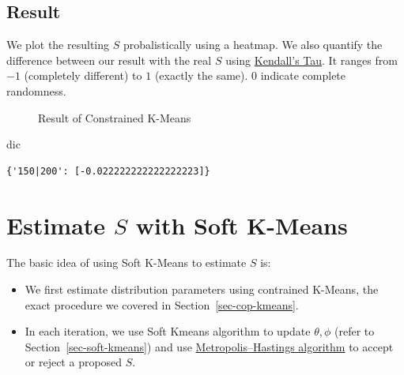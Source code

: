 \documentclass[
  letterpaper,
  DIV=11,
  numbers=noendperiod]{scrreprt}
\newenvironment{Shaded}{\begin{snugshade}}{\end{snugshade}}
\newcommand{\NormalTok}[1]{\textcolor[rgb]{0.00,0.23,0.31}{#1}}
\providecommand{\tightlist}{%
  \setlength{\itemsep}{0pt}\setlength{\parskip}{0pt}}\usepackage{longtable,booktabs,array}
\begin{document}
\section{Result}\label{result-1}

We plot the resulting \(S\) probalistically using a heatmap. We also
quantify the difference between our result with the real \(S\) using
\href{https://en.wikipedia.org/wiki/Kendall_rank_correlation_coefficient}{Kendall's
Tau}. It ranges from \(-1\) (completely different) to \(1\) (exactly the
same). \(0\) indicate complete randomness.

\begin{figure}


\caption{\label{fig-cop-kmeans-result}Result of Constrained K-Means}

\end{figure}%

\begin{Shaded}
\begin{Highlighting}[]
\NormalTok{dic}
\end{Highlighting}
\end{Shaded}

\begin{verbatim}
{'150|200': [-0.022222222222222223]}
\end{verbatim}


\chapter{\texorpdfstring{Estimate \(S\) with Soft
K-Means}{Estimate S with Soft K-Means}}\label{sec-estS-soft-kmeans}

The basic idea of using Soft K-Means to estimate \(S\) is:

\begin{itemize}
\tightlist
\item
  We first estimate distribution parameters using contrained K-Means,
  the exact procedure we covered in Section~\ref{sec-cop-kmeans}.
\item
  In each iteration, we use Soft Kmeans algorithm to update
  \(\theta, \phi\) (refer to Section~\ref{sec-soft-kmeans}) and use
  \href{https://en.wikipedia.org/wiki/Metropolis\%E2\%80\%93Hastings_algorithm}{Metropolis--Hastings
  algorithm} to accept or reject a proposed \(S\).
\end{itemize}
\end{document}

